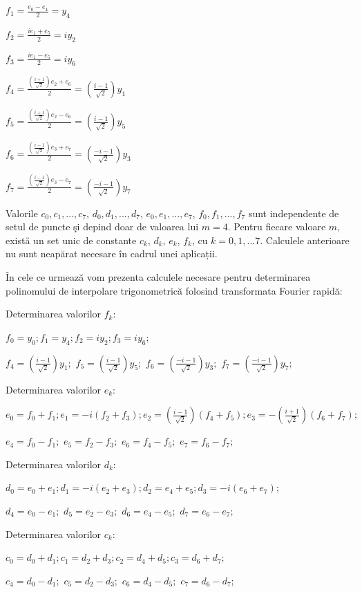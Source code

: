 \documentclass{exam}
\begin{document}
$f_1 = \frac{e_0 - e_4}{2} = y_4$

$f_2 = \frac{ie_1 + e_5}{2} = iy_2$

$f_3 = \frac{ie_1 - e_5}{2} = iy_6$

$f_4 = \frac{(\frac{i+1}{\sqrt{2}})e_2 + e_6}{2} = (\frac{i-1}{\sqrt{2}})y_1$

$f_5 = \frac{(\frac{i+1}{\sqrt{2}})e_2 - e_6}{2} = (\frac{i-1}{\sqrt{2}})y_5$

$f_6 = \frac{(\frac{i-1}{\sqrt{2}})e_3 + e_7}{2} = (\frac{-i-1}{\sqrt{2}})y_3$

$f_7 = \frac{(\frac{i-1}{\sqrt{2}})e_3 - e_7}{2} = (\frac{-i-1}{\sqrt{2}})y_7$

Valorile $c_0, c_1, ..., c_7$, $d_0, d_1, ..., d_7$, $e_0, e_1, ..., e_7$, $f_0, f_1, ..., f_7$ sunt independente de setul de puncte şi depind doar de valoarea lui $m = 4$. Pentru fiecare valoare $m$, există un set unic de constante $c_k$, $d_k$, $e_k$, $f_k$, cu $k = 0, 1, ...7$. Calculele anterioare nu sunt neapărat necesare în cadrul unei aplicații.

În cele ce urmează vom prezenta calculele necesare pentru determinarea polinomului de interpolare trigonometrică folosind transformata Fourier rapidă:

Determinarea valorilor $f_k$:

$f_0 = y_0;    f_1 = y_4;    f_2 = iy_2;    f_3 = iy_6;$

$f_4 = (\frac{i-1}{\sqrt{2}})y_1;$   $f_5 = (\frac{i-1}{\sqrt{2}})y_5;$   $f_6 = (\frac{-i-1}{\sqrt{2}})y_3;$   $f_7 = (\frac{-i-1}{\sqrt{2}})y_7;$

Determinarea valorilor $e_k$:

$e_0 = f_0 + f_1;    e_1 = -i(f_2 + f_3);    e_2 = (\frac{i-1}{\sqrt{2}})(f_4 + f_5);    e_3 = -(\frac{i+1}{\sqrt{2}})(f_6 + f_7);$

$e_4 = f_0 - f_1;$   $e_5 = f_2 - f_3;$   $e_6 = f_4 - f_5;$   $e_7 = f_6 - f_7;$

Determinarea valorilor $d_k$:

$d_0 = e_0 + e_1;    d_1 = -i(e_2 + e_3);    d_2 = e_4 + e_5;    d_3 = -i(e_6 + e_7);$

$d_4 = e_0 - e_1;$   $d_5 = e_2 - e_3;$   $d_6 = e_4 - e_5;$   $d_7 = e_6 - e_7;$

Determinarea valorilor $c_k$:

$c_0 = d_0 + d_1;    c_1 = d_2 + d_3;    c_2 = d_4 + d_5;    c_3 = d_6 + d_7;$

$c_4 = d_0 - d_1;$   $c_5 = d_2 - d_3;$   $c_6 = d_4 - d_5;$   $c_7 = d_6 - d_7;$
\end{document}
